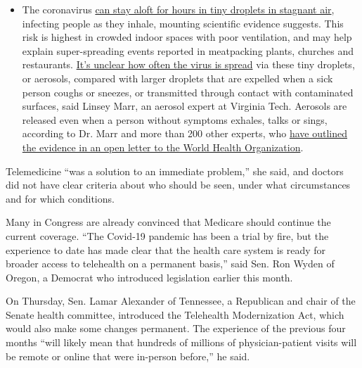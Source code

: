\begin{itemize}
  \begin{itemize}
  \tightlist
  \item
    The coronavirus
    \href{https://www.nytimes3xbfgragh.onion/2020/07/04/health/239-experts-with-one-big-claim-the-coronavirus-is-airborne.html?action=click\&pgtype=Article\&state=default\&region=MAIN_CONTENT_3\&context=storylines_faq}{can
    stay aloft for hours in tiny droplets in stagnant air}, infecting
    people as they inhale, mounting scientific evidence suggests. This
    risk is highest in crowded indoor spaces with poor ventilation, and
    may help explain super-spreading events reported in meatpacking
    plants, churches and restaurants.
    \href{https://www.nytimes3xbfgragh.onion/2020/07/06/health/coronavirus-airborne-aerosols.html?action=click\&pgtype=Article\&state=default\&region=MAIN_CONTENT_3\&context=storylines_faq}{It's
    unclear how often the virus is spread} via these tiny droplets, or
    aerosols, compared with larger droplets that are expelled when a
    sick person coughs or sneezes, or transmitted through contact with
    contaminated surfaces, said Linsey Marr, an aerosol expert at
    Virginia Tech. Aerosols are released even when a person without
    symptoms exhales, talks or sings, according to Dr. Marr and more
    than 200 other experts, who
    \href{https://academic.oup.com/cid/article/doi/10.1093/cid/ciaa939/5867798}{have
    outlined the evidence in an open letter to the World Health
    Organization}.
  \end{itemize}
\end{itemize}

Telemedicine ``was a solution to an immediate problem,'' she said, and
doctors did not have clear criteria about who should be seen, under what
circumstances and for which conditions.

Many in Congress are already convinced that Medicare should continue the
current coverage. ``The Covid-19 pandemic has been a trial by fire, but
the experience to date has made clear that the health care system is
ready for broader access to telehealth on a permanent basis,'' said Sen.
Ron Wyden of Oregon, a Democrat who introduced legislation earlier this
month.

On Thursday, Sen. Lamar Alexander of Tennessee, a Republican and chair
of the Senate health committee, introduced the Telehealth Modernization
Act, which would also make some changes permanent. The experience of the
previous four months ``will likely mean that hundreds of millions of
physician-patient visits will be remote or online that were in-person
before,'' he said.

